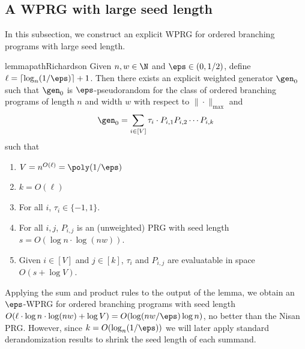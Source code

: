 \documentclass{toc}
\begin{document}
\subsection{A WPRG with large seed length}
In this subsection, we construct an explicit WPRG for ordered branching programs with large seed length.
\begin{restatable}{lemma}{pathRichardson}\label{lem:pathRichardson}
Given $n,w \in \N$ and $\eps \in (0,1/2)$, define $\ell=\lceil \log_{n}(1/\eps)\rceil+1$. Then there exists an explicit weighted generator $\gen_0$ such that $\gen_0$ is $\eps$-pseudorandom for the class of ordered branching programs of length $n$ and width $w$ with respect to $\|\cdot\|_{\max}$ and
\[\gen_0 = \sum_{i\in [V]}\tau_i\cdot P_{i,1}P_{i,2}\cdots P_{i,k}\]
such that %
\begin{enumerate}
    \item $V=n^{O(\ell)}=\poly(1/\eps)$
    \item $k=O(\ell)$
    \item For all $i$, $\tau_i\in \{-1,1\}$.
    \item For all $i,j$, $P_{i,j}$ is an (unweighted) PRG with seed length $s=O(\log n \cdot\log(nw))$.
    \item Given $i\in [V]$ and $j\in [k]$, $\tau_i$ and $P_{i,j}$ are evaluatable in space $O(s+\log V)$.
\end{enumerate}
\end{restatable}
Applying the sum and product rules to the output of the lemma, we obtain an $\eps$-WPRG for ordered branching programs with seed length $O(\ell\cdot \log n\cdot\log(nw)+\log V)=O(\log(nw/\eps)\log n)$, no better than the Nisan PRG. However, since $k=O(\log_{n}(1/\eps))$ we will later apply standard derandomization results to shrink the seed length of each summand.
\end{document}
